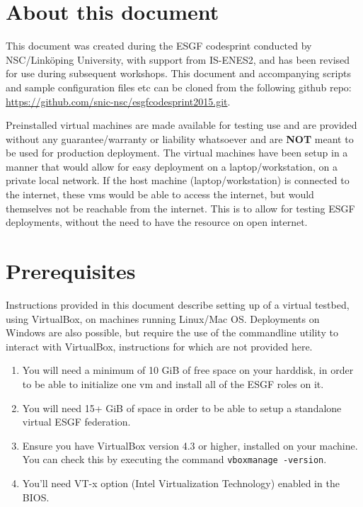 \section {About this document}
This document was created during the ESGF codesprint conducted by NSC/Link\"oping University, with support from IS-ENES2, and has been revised for use during subsequent workshops. 
This document and accompanying scripts and sample configuration files etc can be cloned from the following github repo:\\
\url{https://github.com/snic-nsc/esgfcodesprint2015.git}.
\par\vspace{2mm}\noindent
Preinstalled virtual machines are made available for testing use and are provided without any guarantee/warranty or liability whatsoever and are \textbf{NOT} meant to be used for production deployment.  The virtual machines have been setup in a manner that would allow for easy deployment on a laptop/workstation, on a private local network. If the host machine (laptop/workstation) is connected to the internet, these vms would be able to access the internet, but would themselves not be reachable from the internet. This is to allow for testing ESGF deployments, without the need to have the resource on open internet.
\section{Prerequisites}
Instructions provided in this document describe setting up of a virtual testbed, using VirtualBox, on machines running Linux/Mac OS. Deployments on Windows are also possible, but require the use of the commandline utility to interact with VirtualBox, instructions for which are not provided here.
\begin{enumerate}
\item You will need a minimum of 10 GiB of free space on your harddisk, in order to be able to initialize one vm and install all of the ESGF roles on it.
\item You will need 15+ GiB of space in order to be able to setup a standalone virtual ESGF federation.
\item Ensure you have VirtualBox version 4.3 or higher, installed on your machine. You can check this by executing the command \texttt{vboxmanage -version}.
\item You'll need VT-x option (Intel Virtualization Technology) enabled in the BIOS. 
\end{enumerate}
